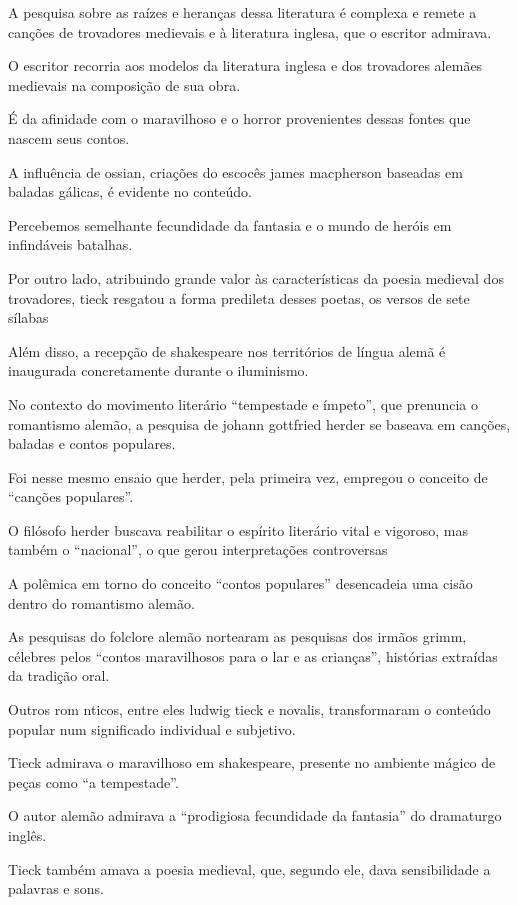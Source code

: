 \documentclass[11pt]{extarticle}
\begin{document}
A pesquisa sobre as raízes e heranças dessa literatura é complexa e remete a canções de trovadores medievais e à literatura inglesa, que o escritor admirava. 

O escritor recorria aos modelos da literatura inglesa e dos trovadores alemães medievais na composição de sua obra. 

É da afinidade com o maravilhoso e o horror provenientes dessas fontes que nascem seus contos.

A influência de ossian, criações do escocês james macpherson baseadas em baladas gálicas, é evidente no conteúdo.

Percebemos semelhante fecundidade da fantasia e o mundo de heróis em infindáveis batalhas.

Por outro lado, atribuindo grande valor às características da poesia medieval dos trovadores, tieck resgatou a forma predileta desses poetas, os versos de sete sílabas 

Além disso, a recepção de shakespeare nos territórios de língua alemã é inaugurada concretamente durante o iluminismo.

No contexto do movimento literário “tempestade e ímpeto”, que prenuncia o romantismo alemão, a pesquisa de johann    gottfried herder se baseava em canções, baladas e contos populares. 

Foi nesse mesmo ensaio que herder, pela primeira vez, empregou o conceito de “canções populares”. 

O filósofo herder buscava reabilitar o espírito literário vital e vigoroso, mas também o “nacional”, o que gerou interpretações controversas 

A polêmica em torno do conceito “contos populares” desencadeia uma cisão dentro do romantismo alemão. 

As pesquisas do folclore alemão nortearam as pesquisas dos irmãos grimm, célebres pelos “contos maravilhosos para o lar e as crianças”, histórias extraídas da tradição oral. 

Outros rom nticos, entre eles ludwig tieck e novalis, transformaram o conteúdo popular num significado individual e subjetivo. 

Tieck admirava o maravilhoso em shakespeare, presente no ambiente mágico de peças como “a tempestade”.

O autor alemão admirava a “prodigiosa fecundidade da fantasia” do dramaturgo inglês.

Tieck também amava a poesia medieval, que, segundo ele, dava sensibilidade a palavras e sons. 
\end{document}
